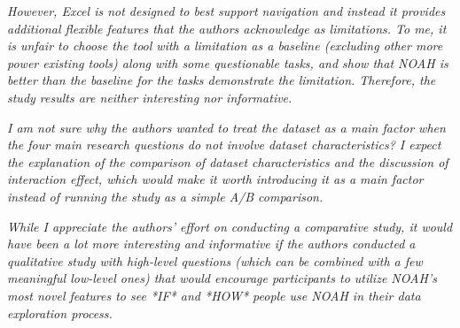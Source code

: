  \textit{However, Excel is not designed to best support navigation and instead it provides
    additional flexible features that the authors acknowledge as limitations. To me,
    it is unfair to choose the tool with a limitation as a baseline (excluding other
    more power existing tools) along with some questionable tasks, and show that NOAH
    is better than the baseline for the tasks demonstrate the limitation. Therefore,
    the study results are neither interesting nor informative.}


 \textit{I am not sure
    why the authors wanted to treat the dataset as a main factor when the four main
    research questions do not involve dataset characteristics? I expect the
    explanation of the comparison of dataset characteristics and the discussion of
    interaction effect, which would make it worth introducing it as a main factor
    instead of running the study as a simple A/B comparison.}
    
 

 \textit{While I appreciate the authors’ effort on conducting a comparative study, it would
    have been a lot more interesting and informative if the authors conducted a
    qualitative study with high-level questions (which can be combined with a few
    meaningful low-level ones) that would encourage participants to utilize NOAH’s
    most novel features to see *IF* and *HOW* people use NOAH in their data
    exploration process.}
    
 
    
